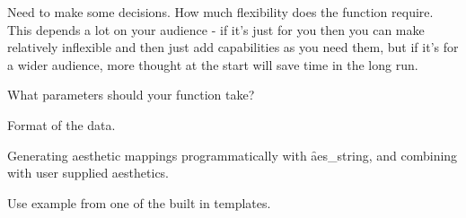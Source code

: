 Need to make some decisions.  How much flexibility does the function require.  This depends a lot on your audience - if it's just for you then you can make relatively inflexible and then just add capabilities as you need them, but if it's for a wider audience, more thought at the start will save time in the long run.

What parameters should your function take?

Format of the data.

Generating aesthetic mappings programmatically with \f{aes_string}, and combining with user supplied aesthetics.

Use example from one of the built in templates.  



